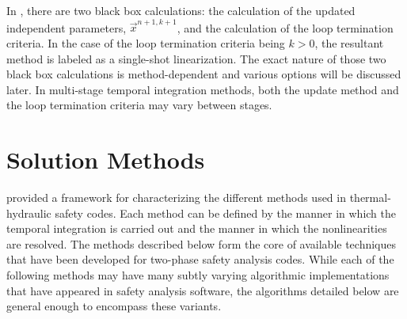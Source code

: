 In , there are two black box calculations: the calculation of the updated independent parameters, $\vec{x}^{n+1,k+1}$, and the calculation of the loop termination criteria.
In the case of the loop termination criteria being $k > 0$, the resultant method is labeled as a single-shot linearization.
The exact nature of those two black box calculations is method-dependent and various options will be discussed later.
In multi-stage temporal integration methods, both the update method and the loop termination criteria may vary between stages. 

\section{Solution Methods}
\label{sect:solution_techniques}

 provided a framework for characterizing the different methods used in thermal-hydraulic safety codes. 
Each method can be defined by the manner in which the temporal integration is carried out and the manner in which the nonlinearities are resolved.
The methods described below form the core of available techniques that have been developed for two-phase safety analysis codes. 
While each of the following methods may have many subtly varying algorithmic implementations that have appeared in safety analysis software, the algorithms detailed below are general enough to encompass these variants.

